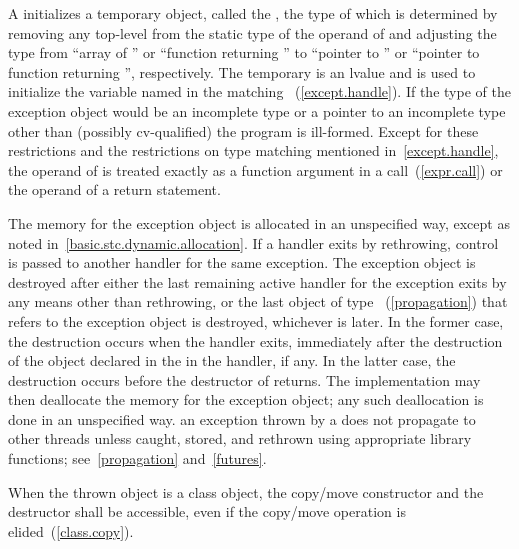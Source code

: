 \pnum
A
initializes a temporary object,
called the
,
the type of which
is determined by removing any top-level
from the static type of the operand of
and adjusting the type from ``array of
''
or ``function returning
''
to ``pointer to
''
or ``pointer to function
returning
'',
respectively.
The temporary is an lvalue and is used to initialize the
variable named in the matching
~(\ref{except.handle}).
If the type of the exception object would
be an incomplete type or a pointer to an incomplete
type other than (possibly cv-qualified)
 the program is ill-formed.
Except for these restrictions and the restrictions on type matching mentioned
in~\ref{except.handle}, the operand of
is treated exactly as a function argument in a call~(\ref{expr.call}) or the operand
of a return statement.

\pnum
{}%
%
%
The memory for the exception object is
allocated in an unspecified way, except as noted in~\ref{basic.stc.dynamic.allocation}.
If a handler exits by rethrowing, control is passed to another handler for
the same exception.
The exception object is destroyed after either
the last remaining active handler for the exception exits by
any means other than
rethrowing, or the last object of type ~(\ref{propagation})
that refers to the exception object is destroyed, whichever is later. In the former
case, the destruction occurs when the handler exits, immediately after the destruction
of the object declared in the  in the handler, if any.
In the latter case, the destruction occurs before the destructor of 
returns.
The implementation may then
deallocate the memory for the exception object; any such deallocation
is done in an unspecified way.
\enternote an exception thrown by a  does not
propagate to other threads unless caught, stored, and rethrown using
appropriate library functions; see~\ref{propagation} and~\ref{futures}. \exitnote

\pnum
{}%
%
When the thrown object is a class object, the copy/move constructor and the
destructor shall be accessible, even if the copy/move operation is
elided~(\ref{class.copy}).

